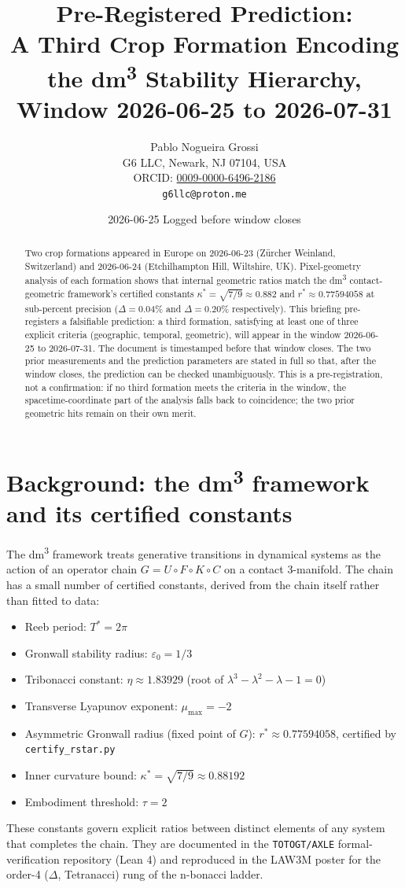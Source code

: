 \documentclass[11pt,a4paper]{article}
\title{\Large \textbf{Pre-Registered Prediction:\\
A Third Crop Formation Encoding the dm\textsuperscript{3} Stability Hierarchy,\\
Window 2026-06-25 to 2026-07-31}}
\author{Pablo Nogueira Grossi \\
G6 LLC, Newark, NJ 07104, USA \\
ORCID: \href{https://orcid.org/0009-0000-6496-2186}{0009-0000-6496-2186} \\
\texttt{g6llc@proton.me}}
\date{2026-06-25 \hspace{0.5em}\textbar\hspace{0.5em} Logged before window closes}
\begin{document}
\maketitle

\begin{abstract}
\noindent
Two crop formations appeared in Europe on 2026-06-23 (Z\"urcher Weinland, Switzerland) and 2026-06-24 (Etchilhampton Hill, Wiltshire, UK). Pixel-geometry analysis of each formation shows that internal geometric ratios match the dm\textsuperscript{3} contact-geometric framework's certified constants $\kappa^* = \sqrt{7/9} \approx 0.882$ and $r^* \approx 0.77594058$ at sub-percent precision ($\Delta = 0.04\%$ and $\Delta = 0.20\%$ respectively). This briefing pre-registers a falsifiable prediction: a third formation, satisfying at least one of three explicit criteria (geographic, temporal, geometric), will appear in the window 2026-06-25 to 2026-07-31. The document is timestamped before that window closes. The two prior measurements and the prediction parameters are stated in full so that, after the window closes, the prediction can be checked unambiguously. This is a pre-registration, not a confirmation: if no third formation meets the criteria in the window, the spacetime-coordinate part of the analysis falls back to coincidence; the two prior geometric hits remain on their own merit.
\end{abstract}

\section{Background: the dm\textsuperscript{3} framework and its certified constants}

The dm\textsuperscript{3} framework \cite{principia2026} treats generative transitions in dynamical systems as the action of an operator chain $G = U \circ F \circ K \circ C$ on a contact 3-manifold. The chain has a small number of certified constants, derived from the chain itself rather than fitted to data:
\begin{itemize}
  \item Reeb period: $T^{*} = 2\pi$
  \item Gronwall stability radius: $\varepsilon_0 = 1/3$
  \item Tribonacci constant: $\eta \approx 1.83929$ (root of $\lambda^3 - \lambda^2 - \lambda - 1 = 0$)
  \item Transverse Lyapunov exponent: $\mu_{\max} = -2$
  \item Asymmetric Gronwall radius (fixed point of $G$): $r^* \approx 0.77594058$, certified by \texttt{certify\_rstar.py}
  \item Inner curvature bound: $\kappa^* = \sqrt{7/9} \approx 0.88192$
  \item Embodiment threshold: $\tau = 2$
\end{itemize}
These constants govern explicit ratios between distinct elements of any system that completes the chain. They are documented in the \texttt{TOTOGT/AXLE} formal-verification repository (Lean 4) and reproduced in the LAW3M poster for the order-4 ($\Delta$, Tetranacci) rung of the n-bonacci ladder.
\end{document}
